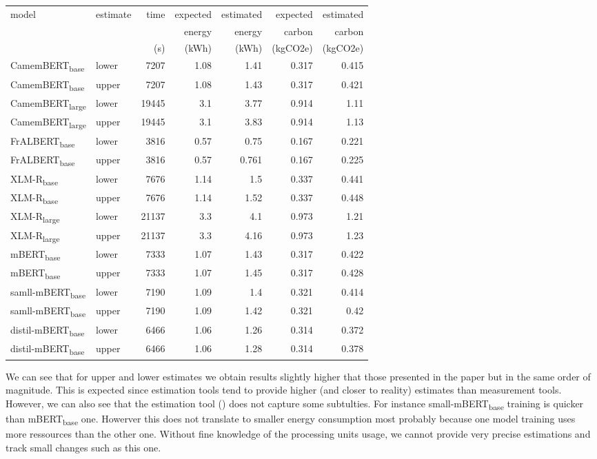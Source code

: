 \documentclass[11pt]{article}
\begin{document}
\begin{center}
\begin{tabular}{llrrrrr}
model & estimate & time & expected & estimated & expected & estimated\\
 &  &  & energy & energy & carbon & carbon\\
 &  & (s) & (kWh) & (kWh) & (kgCO2e) & (kgCO2e)\\
\hline
CamemBERT\textsubscript{base} & lower & 7207 & 1.08 & 1.41 & 0.317 & 0.415\\
CamemBERT\textsubscript{base} & upper & 7207 & 1.08 & 1.43 & 0.317 & 0.421\\
CamemBERT\textsubscript{large} & lower & 19445 & 3.1 & 3.77 & 0.914 & 1.11\\
CamemBERT\textsubscript{large} & upper & 19445 & 3.1 & 3.83 & 0.914 & 1.13\\
FrALBERT\textsubscript{base} & lower & 3816 & 0.57 & 0.75 & 0.167 & 0.221\\
FrALBERT\textsubscript{base} & upper & 3816 & 0.57 & 0.761 & 0.167 & 0.225\\
XLM-R\textsubscript{base} & lower & 7676 & 1.14 & 1.5 & 0.337 & 0.441\\
XLM-R\textsubscript{base} & upper & 7676 & 1.14 & 1.52 & 0.337 & 0.448\\
XLM-R\textsubscript{large} & lower & 21137 & 3.3 & 4.1 & 0.973 & 1.21\\
XLM-R\textsubscript{large} & upper & 21137 & 3.3 & 4.16 & 0.973 & 1.23\\
mBERT\textsubscript{base} & lower & 7333 & 1.07 & 1.43 & 0.317 & 0.422\\
mBERT\textsubscript{base} & upper & 7333 & 1.07 & 1.45 & 0.317 & 0.428\\
samll-mBERT\textsubscript{base} & lower & 7190 & 1.09 & 1.4 & 0.321 & 0.414\\
samll-mBERT\textsubscript{base} & upper & 7190 & 1.09 & 1.42 & 0.321 & 0.42\\
distil-mBERT\textsubscript{base} & lower & 6466 & 1.06 & 1.26 & 0.314 & 0.372\\
distil-mBERT\textsubscript{base} & upper & 6466 & 1.06 & 1.28 & 0.314 & 0.378\\
\end{tabular}
\end{center}

We can see that for upper and lower estimates we obtain results slightly higher that those presented
in the paper but in the same order of magnitude. This is expected
since estimation tools tend to provide higher (and closer to reality) estimates than
measurement tools. However, we can also see that the estimation tool (\cite{Jay2023experimental})
does not capture some subtulties. For instance small-mBERT\textsubscript{base}
training is quicker than mBERT\textsubscript{base} one. Howerver this does not
translate to smaller energy consumption most probably because one
model training uses more ressources than the other one. Without fine
knowledge of the processing units usage, we cannot provide very
precise estimations and track small changes such as this one.
\end{document}
